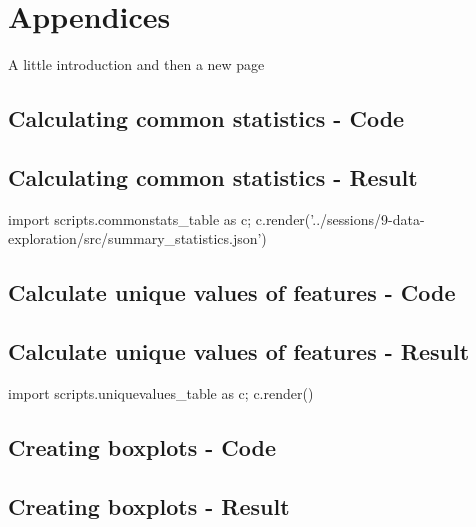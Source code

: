 \chapter{Appendices}
A little introduction and then a new page
\pagebreak

\section{Calculating common statistics - Code}\label{app:source-common-statistics}



\pagebreak

\section{Calculating common statistics - Result}\label{app:result-common-statistics}
{\small\sffamily
\begin{python}
    import scripts.commonstats_table as c; c.render('../sessions/9-data-exploration/src/summary_statistics.json')
\end{python}
}

\clearpage

\section{Calculate unique values of features - Code} %
\label{app:source-unique-values}




\clearpage

\section{Calculate unique values of features - Result} %
\label{app:result-unique-values}
{\small\sffamily
\begin{python}
    import scripts.uniquevalues_table as c; c.render()
\end{python}
}

\section{Creating boxplots - Code} %
\label{app:source-boxplots}

\section{Creating boxplots - Result} %
\label{app:result-boxplots}
